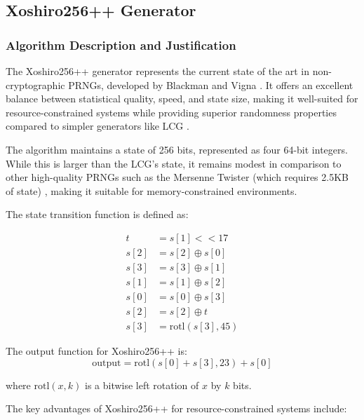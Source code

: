 \subsection{Xoshiro256++ Generator}

\subsubsection{Algorithm Description and Justification}

The Xoshiro256++ generator represents the current state of the art in non-cryptographic PRNGs, developed by Blackman and Vigna \cite{blackman2019}. It offers an excellent balance between statistical quality, speed, and state size, making it well-suited for resource-constrained systems while providing superior randomness properties compared to simpler generators like LCG \cite{xoshiro_website}.

The algorithm maintains a state of 256 bits, represented as four 64-bit integers. While this is larger than the LCG's state, it remains modest in comparison to other high-quality PRNGs such as the Mersenne Twister (which requires 2.5KB of state) \cite{matsumoto1998}, making it suitable for memory-constrained environments.

The state transition function is defined as:

\begin{align}
t &= s[1] << 17 \\
s[2] &= s[2] \oplus s[0] \\
s[3] &= s[3] \oplus s[1] \\
s[1] &= s[1] \oplus s[2] \\
s[0] &= s[0] \oplus s[3] \\
s[2] &= s[2] \oplus t \\
s[3] &= \text{rotl}(s[3], 45)
\end{align}

The output function for Xoshiro256++ is:
\begin{equation}
\text{output} = \text{rotl}(s[0] + s[3], 23) + s[0]
\end{equation}

where $\text{rotl}(x, k)$ is a bitwise left rotation of $x$ by $k$ bits.

The key advantages of Xoshiro256++ for resource-constrained systems include:

